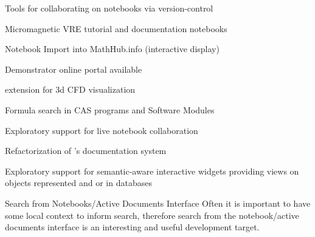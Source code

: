 \begin{workpackage}
\begin{wpdelivs}
  \begin{wpdeliv}[due=12,id=jupyter-collab,dissem=PU,nature=OTHER,lead=SR]
      {Tools for collaborating on notebooks via version-control}
  \end{wpdeliv}
    \begin{wpdeliv}[due=21,id=oommf-nb-documentation,dissem=PU,nature=DEC,lead=USO]
      {Micromagnetic VRE tutorial and documentation notebooks}
    \end{wpdeliv}
    \begin{wpdeliv}[id=jupyter-import,due=24,nature=DEM,dissem=PU,lead=JU]
      {Notebook Import into MathHub.info (interactive display)}
    \end{wpdeliv}
    \begin{wpdeliv}[due=24,id=oommf-nb-tmp,dissem=PU,nature=DEC,lead=USO]
      {Demonstrator online portal available}
    \end{wpdeliv}
  \begin{wpdeliv}[due=24,id=cfd-vis,dissem=PU,nature=OTHER,lead=SR]
      {\Jupyter extension for 3d CFD visualization}
  \end{wpdeliv}
   \begin{wpdeliv}[id=cassearch,due=30,nature=OTHER,dissem=PU,lead=JU]
      {Formula search in CAS programs and Software Modules}
    \end{wpdeliv}
  \begin{wpdeliv}[due=36,id=jupyter-live-collab,dissem=PU,nature=OTHER,lead=SR]
      {Exploratory support for live notebook collaboration}
  \end{wpdeliv}
  \begin{wpdeliv}[due=24,id=sage-sphinx,dissem=PU,nature=OTHER,lead=PS]
      {Refactorization of \Sage's \Sphinx documentation system}
  \end{wpdeliv}
  \begin{wpdeliv}[due=36,id=ipython-advanced-interacts,dissem=PU,nature=DEM,lead=PS]
      {Exploratory support for semantic-aware interactive widgets providing views on objects
      represented and or in databases}
  \end{wpdeliv}
\begin{wpdeliv}[id=nbad-search,due=42,nature=OTHER,dissem=PU,lead=JU]
  {Search from Notebooks/Active Documents Interface} Often it is important to have some
  local context to inform search, therefore search from the notebook/active documents
  interface is an interesting and useful development target.
\end{wpdeliv}


\end{wpdelivs}
\end{workpackage}
